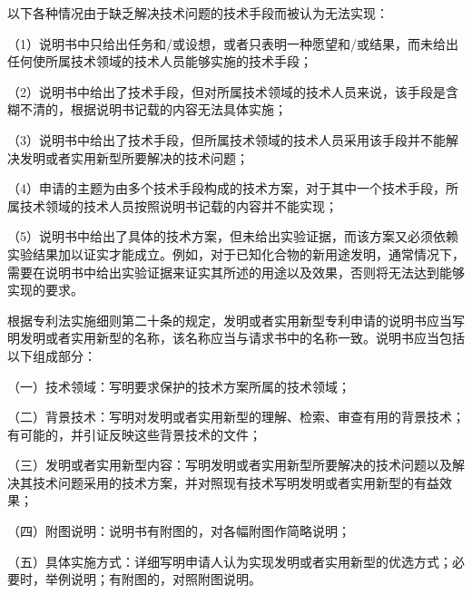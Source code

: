 以下各种情况由于缺乏解决技术问题的技术手段而被认为无法实现：

{\setlength{\parindent}{17.1bp}（1）说明书中只给出任务和/或设想，或者只表明一种愿望和/或结果，而未给出任何使所属技术领域的技术人员能够实施的技术手段；\par}

{\setlength{\parindent}{17.1bp}（2）说明书中给出了技术手段，但对所属技术领域的技术人员来说，该手段是含糊不清的，根据说明书记载的内容无法具体实施；\par}

{\setlength{\parindent}{17.1bp}（3）说明书中给出了技术手段，但所属技术领域的技术人员采用该手段并不能解决发明或者实用新型所要解决的技术问题；\par}

{\setlength{\parindent}{17.1bp}（4）申请的主题为由多个技术手段构成的技术方案，对于其中一个技术手段，所属技术领域的技术人员按照说明书记载的内容并不能实现；\par}

{\setlength{\parindent}{17.1bp}（5）说明书中给出了具体的技术方案，但未给出实验证据，而该方案又必须依赖实验结果加以证实才能成立。例如，对于已知化合物的新用途发明，通常情况下，需要在说明书中给出实验证据来证实其所述的用途以及效果，否则将无法达到能够实现的要求。\par}

根据专利法实施细则第二十条的规定，发明或者实用新型专利申请的说明书应当写明发明或者实用新型的名称，该名称应当与请求书中的名称一致。说明书应当包括以下组成部分：

{\setlength{\parindent}{17.1bp}（一）技术领域：写明要求保护的技术方案所属的技术领域；\par}

{\setlength{\parindent}{17.1bp}（二）背景技术：写明对发明或者实用新型的理解、检索、审查有用的背景技术；有可能的，并引证反映这些背景技术的文件；\par}

{\setlength{\parindent}{17.1bp}（三）发明或者实用新型内容：写明发明或者实用新型所要解决的技术问题以及解决其技术问题采用的技术方案，并对照现有技术写明发明或者实用新型的有益效果；\par}

{\setlength{\parindent}{17.1bp}（四）附图说明：说明书有附图的，对各幅附图作简略说明；\par}

{\setlength{\parindent}{17.1bp}（五）具体实施方式：详细写明申请人认为实现发明或者实用新型的优选方式；必要时，举例说明；有附图的，对照附图说明。\par}

